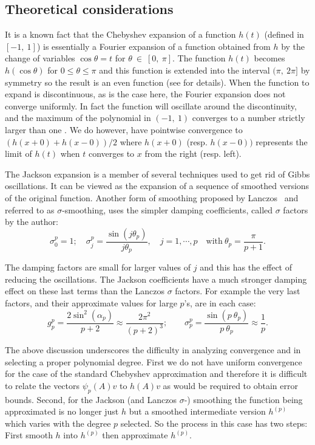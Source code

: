 \documentclass[12pt]{article}		\usepackage{tabls,multirow}
\begin{document}
\subsection{Theoretical considerations}\label{sec:Analysis}
It is a known fact that the Chebyshev expansion of a function $h(t)$
(defined in $[-1,\ 1]$) is essentially a Fourier expansion of a
function obtained from $h$ by the change of variables $\cos \theta =
t$ for $\theta \ \in \ [0, \ \pi]$.  The function $h(t)$ becomes
$h(\cos \theta)$ for $0 \le \theta \le \pi$ and this function is
extended into the interval $(\pi, \ 2 \pi]$ by symmetry so the result
is an even function (see \cite[sec.  2.4]{Rivlin} for details). When
the function to expand is discontinuous, as is the case here, the
Fourier expansion does not converge uniformly. In fact the function
will oscillate around the discontinuity, and the maximum of the
polynomial in $(-1, \ 1)$ converges to a number strictly larger than
one \cite{Angot}.  We do however, have pointwise convergence to
$(h(x+0)+h(x-0))/2$ where $h(x+0) $ (resp. $h(x-0))$ represents the
limit of $h(t)$ when $t$ converges to $x$ from the right (resp. left).

The Jackson expansion is a member of several techniques 
used to get rid of Gibbs oscillations. 
It can be viewed as the expansion of a 
sequence of smoothed versions of the original
function. 
Another form of smoothing proposed by Lanczos~\cite[Chap. 4]{Lanczos-book} and
referred to as $\sigma$-smoothing,
uses the   simpler damping coefficients, called 
 $\sigma$ factors by the author:
\[
\sigma_0^p =1; \quad 
\sigma_j^p = \frac{ \sin ( j \theta_p ) }{j \theta_p}, \quad
j=1,\cdots,p \quad \mbox{with} \   
\theta_p =\frac{\pi}{p+1} . 
\] 

The damping factors are small for larger values of $j$ and this has the
effect of reducing the oscillations. The Jackson coefficients have a much
stronger damping effect on these  last terms than the Lanczos $\sigma$ factors.
 For example the 
very last factors, and their approximate values for large $p$'s,  are  in each case:
\[
g_{p}^{p} = 
\frac{2 \sin^2 (\alpha_p) }{p+2} \approx \frac{2 \pi^2}{(p+2)^3}  ;
\qquad
\sigma_p^p = 
\frac{ \sin (p\ \theta_p ) }{p\ \theta_p}\approx
 \frac{1}{p} .
\] 

The above discussion underscores the difficulty in analyzing
convergence and in selecting a proper polynomial degree.  First we do
not have uniform convergence for the case of the standard Chebyshev
approximation and therefore it is difficult to relate the vectors
$\psi_p(A)v$ to $h(A)v$ as would be required to obtain error bounds.
Second, for the Jackson (and Lanczos $\sigma$-) smoothing the function
being approximated is no longer just $h$ but a smoothed intermediate
version $h^{(p)}$ which varies with the degree $p$ selected.  So the
process in this case has two steps: First smooth $h$ into $h^{(p)}$
then approximate $h^{(p)}$.
\end{document}
